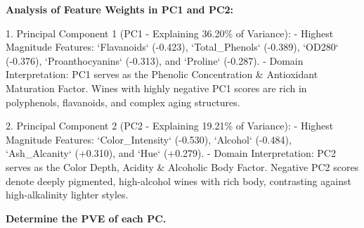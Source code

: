 \vspace{0.3em}
\begin{tcolorbox}[colback=gray!5!white,colframe=gray!50!black,boxrule=0.5pt,arc=2pt,left=4pt,right=4pt,top=2pt,bottom=2pt,unbreakable,before upper={\sloppy\raggedright}]
{\small\bfseries Analysis of Feature Weights in PC1 and PC2:

1. Principal Component 1 (PC1 - Explaining 36.20\% of Variance):
   - Highest Magnitude Features: `Flavanoids` (-0.423), `Total\_Phenols` (-0.389), `OD280` (-0.376), `Proanthocyanins` (-0.313), and `Proline` (-0.287).
   - Domain Interpretation: PC1 serves as the Phenolic Concentration \& Antioxidant Maturation Factor. Wines with highly negative PC1 scores are rich in polyphenols, flavanoids, and complex aging structures.

2. Principal Component 2 (PC2 - Explaining 19.21\% of Variance):
   - Highest Magnitude Features: `Color\_Intensity` (-0.530), `Alcohol` (-0.484), `Ash\_Alcanity` (+0.310), and `Hue` (+0.279).
   - Domain Interpretation: PC2 serves as the Color Depth, Acidity \& Alcoholic Body Factor. Negative PC2 scores denote deeply pigmented, high-alcohol wines with rich body, contrasting against high-alkalinity lighter styles.\par}
\end{tcolorbox}

\vspace{0.3em}
\begin{tcolorbox}[colback=gray!5!white,colframe=gray!50!black,boxrule=0.5pt,arc=2pt,left=4pt,right=4pt,top=2pt,bottom=2pt,unbreakable,before upper={\sloppy\raggedright}]
{\small\bfseries Determine the PVE of each PC.\par}
\end{tcolorbox}

